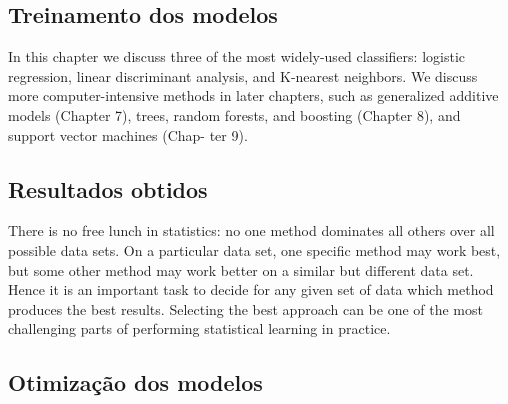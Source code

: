 





		\subsection{Treinamento dos modelos}

		In this chapter we discuss three of the most
widely-used classifiers: logistic regression, linear discriminant analysis, and
K-nearest neighbors. We discuss more computer-intensive methods in later
chapters, such as generalized additive models (Chapter 7), trees, random
forests, and boosting (Chapter 8), and support vector machines (Chap-
ter 9).

		\subsection{Resultados obtidos}

		There
		is no free lunch in statistics: no one method dominates all others over all
		possible data sets. On a particular data set, one specific method may work
		best, but some other method may work better on a similar but different
		data set. Hence it is an important task to decide for any given set of data
		which method produces the best results. Selecting the best approach can
		be one of the most challenging parts of performing statistical learning in
		practice.


		\subsection{Otimização dos modelos}

